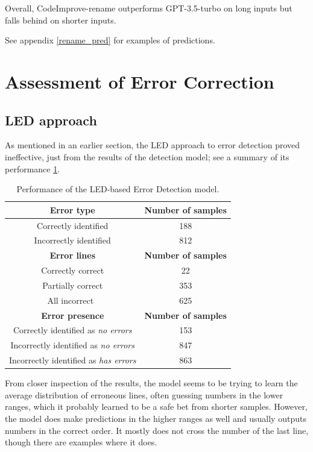         Overall, CodeImprove-rename outperforms GPT-3.5-turbo on long inputs but falls behind on shorter inputs.

        See appendix \ref{rename_pred} for examples of predictions.
        
    \section{Assessment of Error Correction}
        \subsection{LED approach}
        As mentioned in an earlier section, the LED approach to error detection proved ineffective, just from the results of the detection model; see a summary of its performance \ref{tab:error_detection}.
        \begin{table}[H]
            \centering
            \begin{tabular}{|c|c|}
            \hline
            \textbf{Error type} & \textbf{Number of samples}  \\
            \hline
            Correctly identified & 188 \\
            Incorrectly identified & 812 \\
            \hline
            \hline
            \textbf{Error lines} & \textbf{Number of samples}  \\
            \hline
            Correctly correct & 22 \\
            Partially correct & 353 \\
            All incorrect\ & 625 \\
            \hline
            \hline
            \textbf{Error presence} & \textbf{Number of samples}  \\
            \hline
            Correctly identified as \textit{no errors} & 153 \\
            Incorrectly identified as \textit{no errors} & 847 \\
            Incorrectly identified as \textit{has errors} & 863 \\
            \hline
            \end{tabular}
            \caption{Performance of the LED-based Error Detection model.}
            \label{tab:error_detection}
        \end{table}

        From closer inspection of the results, the model seems to be trying to learn the average distribution of erroneous lines, often guessing numbers in the lower ranges, which it probably learned to be a safe bet from shorter samples. However, the model does make predictions in the higher ranges as well and usually outputs numbers in the correct order. It mostly does not cross the number of the last line, though there are examples where it does.

